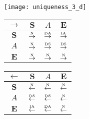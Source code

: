 \begin{figure}[htbp]
  \begin{subfigure}{1\textwidth}
    \vspace{1em}
    \centering
    \begin{minipage}[b]{1\textwidth}
      \centering
      \texttt{[image: uniqueness\_3\_d]}
    \end{minipage}
    \begin{minipage}[b]{0.3\textwidth}
      \vspace{1em}
      \centering
      \begin{tabular}{|c|c|c|c|} \hline
        $\rightarrow$ & $\bm{S}$ & $A$ & $\bm{E}$\\ \hline
        $\bm{S}$ & $\overset{\text{\tiny{N}}}{\rightarrow}$ & $\overset{\text{\tiny{DA}}}{\rightarrow}$ & $\overset{\text{\tiny{IA}}}{\rightarrow}$\\ \hline
        $A$ & $\overset{\text{\tiny{N}}}{\rightarrow}$ & $\overset{\text{\tiny{DS}}}{\rightarrow}$ & $\overset{\text{\tiny{DS}}}{\rightarrow}$\\ \hline
        $\bm{E}$ & $\overset{\text{\tiny{N}}}{\rightarrow}$ & $\overset{\text{\tiny{N}}}{\rightarrow}$ & $\overset{\text{\tiny{N}}}{\rightarrow}$\\ \hline
      \end{tabular}
    \end{minipage}
    \begin{minipage}[b]{0.3\textwidth}
      \vspace{1em}
      \centering
      \begin{tabular}{|c|c|c|c|} \hline
        $\leftarrow$ & $\bm{S}$ & $A$ & $\bm{E}$\\ \hline
        $\bm{S}$ & $\overset{\text{\tiny{N}}}{\leftarrow}$ & $\overset{\text{\tiny{N}}}{\leftarrow}$ & $\overset{\text{\tiny{N}}}{\leftarrow}$\\ \hline
        $A$ & $\overset{\text{\tiny{DS}}}{\leftarrow}$ & $\overset{\text{\tiny{DS}}}{\leftarrow}$ & $\overset{\text{\tiny{N}}}{\leftarrow}$\\ \hline
        $\bm{E}$ & $\overset{\text{\tiny{IA}}}{\leftarrow}$ & $\overset{\text{\tiny{DA}}}{\leftarrow}$ & $\overset{\text{\tiny{N}}}{\leftarrow}$\\ \hline
      \end{tabular}
    \end{minipage}
    \begin{minipage}[b]{0.3\textwidth}
      \vspace{1em}
      \centering
      \begin{tabular}{|c|c|c|c|} \hline

\end{tabular}
\end{minipage}
\end{subfigure}
\end{figure}

